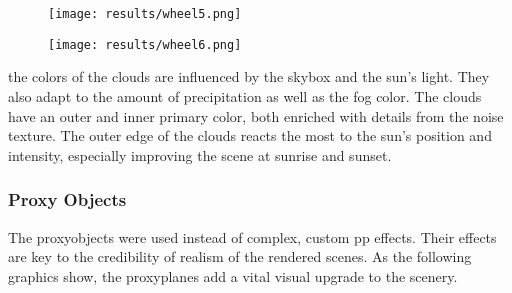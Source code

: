 \begin{figure}[H]
    \centering
        \begin{minipage}{0.47\linewidth}
            \texttt{[image: results/wheel5.png]}
            \label{img:result:5}
        \end{minipage}
    \hfill
        \begin{minipage}{0.47\linewidth}
            \texttt{[image: results/wheel6.png]}
            \label{img:result:6}
        \end{minipage}
\end{figure}

\noindent
the colors of the clouds are influenced by the skybox and the sun's light. They also adapt to the amount of \gls{precipitation} as well as the fog color.
The clouds have an outer and inner primary color, both enriched with details from the \gls{noise} texture.
The outer edge of the clouds reacts the most to the sun's position and intensity, especially improving the scene at sunrise and sunset.

\clearpage

\subsubsection{Proxy Objects}
The \gls{proxyobject}s were used instead of complex, custom \gls{pp} effects. Their effects are key to the credibility of realism of the rendered scenes.
As the following graphics show, the \gls{proxyplane}s add a vital visual upgrade to the scenery.
\begin{figure}[H]
    \centering
    \label{img:results:rainproxy}
\end{figure}

